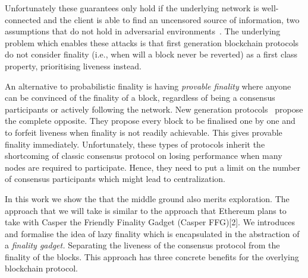 \documentclass{article}
\begin{document}
Unfortunately these guarantees only hold if the underlying network is well-connected and the client is able to find an uncensored source of information, two assumptions that
do not hold in adversarial environments~\cite{apostolaki16hijacking, gervais15tampering, heilman15eclipse}.
The underlying problem which enables these attacks is that first generation blockchain protocols do not consider finality (i.e., when will a block never be reverted) as a first class property, prioritising liveness instead.

An alternative to probabilistic finality is having \emph{provable finality} where anyone can be convinced of the finality of a block, regardless of being a consensus participants or actively following the network.%
New generation protocols~\cite{kokoris16enhancing,decker16bitcoin,pass16hybrid} propose the complete opposite. They propose every block to be finalised one by one and to forfeit liveness when finality is not readily achievable. This gives provable finality immediately.%
Unfortunately, these types of protocols inherit the shortcoming of classic consensus protocol on losing performance when many nodes are required to participate. Hence, they need to put a limit on the number of consensus participants which might lead to centralization. 



In this work we show the that the middle ground also merits exploration. The approach that we will take is similar to the approach that Ethereum plans to take with Casper the Friendly Finality Gadget (Casper FFG)[2].
We introduces and formalise the idea of lazy finality which is encapsulated in the abstraction of a \emph{finality gadget.} Separating the liveness of the consensus protocol from the finality of the blocks. This approach has three concrete benefits for the overlying blockchain protocol. 
\end{document}
